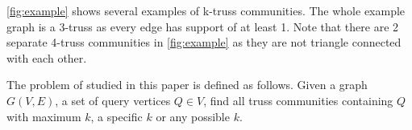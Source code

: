 \autoref{fig:example} shows several examples of k-truss communities. The whole example graph is a 3-truss as every edge has support of at least 1. Note that there are 2 separate 4-truss communities in \autoref{fig:example} as they are not triangle connected with each other.

\textbf{\ProbDef{}} The problem of studied in this paper is defined as follows. Given a graph $G(V,E)$, a set of query vertices $Q \in V$, find all truss communities containing $Q$ with maximum $k$, a specific $k$ or any possible $k$. 